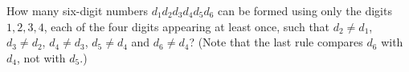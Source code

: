 How many six-digit numbers $d_1d_2d_3d_4d_5d_6$ can be formed using only the digits $1,2,3,4$, each of the four digits appearing at least once, such that $d_2\ne d_1$, $d_3\ne d_2$, $d_4\ne d_3$, $d_5\ne d_4$ and $d_6\ne d_4$? (Note that the last rule compares $d_6$ with $d_4$, not with $d_5$.)
